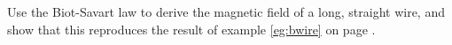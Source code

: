         Use the Biot-Savart law to derive the magnetic field of a long, straight wire,
        and show that this reproduces the result of example \ref{eg:bwire} on page \pageref{eg:bwire}.
